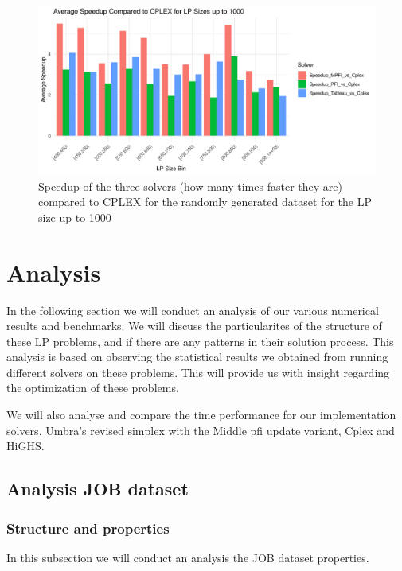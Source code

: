 \begin{figure}[!htb]
    \centering
    \includegraphics[width=\linewidth]{figures/speedup_cplex_less_1000.pdf}
    \caption{Speedup of the three solvers (how many times faster they are) compared to CPLEX for
        the randomly generated dataset for the LP size up to 1000}
    \label{fig:speedup_cplex_less_1000.pdf}
\end{figure}

\section{Analysis}
In the following section we will conduct an analysis of our various numerical results
and benchmarks.
We will discuss the
particularites of the structure of these LP problems, and if there are any
patterns in their solution
process. This analysis is based on observing the statistical results we obtained from
running different solvers on these problems. This will provide us with insight
regarding the optimization of these problems.

We will also analyse and compare the time performance for our implementation solvers,
Umbra's revised simplex with the Middle \gls{pfi} update variant, Cplex and HiGHS.


\subsection{Analysis JOB dataset}

\subsubsection{Structure and properties}
In  this subsection we will conduct an analysis the JOB dataset properties.

